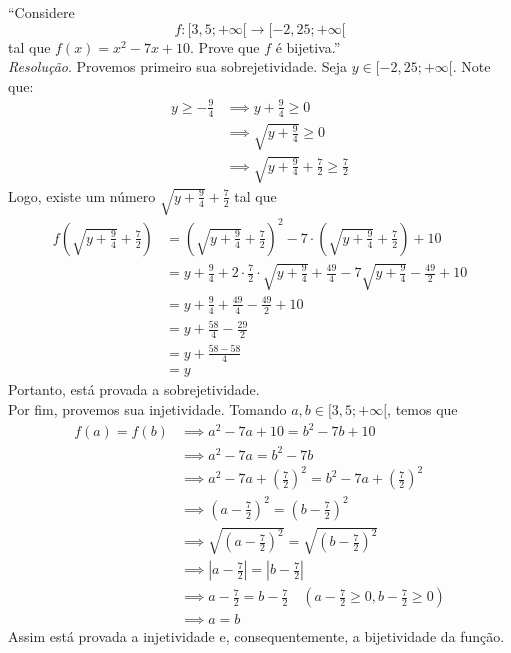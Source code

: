 \enquote{Considere 
\begin{displaymath}
    f: [3,5; +\infty[ \rightarrow  [-2,25; + \infty[
\end{displaymath}
tal que $f(x) = x^2 - 7x + 10$. Prove que $f$ é bijetiva.}
\\ \emph{Resolução}. Provemos primeiro sua sobrejetividade. Seja $y \in [-2,25; + \infty[$. Note que: 
\begin{align*}
    y \ge -\frac{9}{4} & \implies y + \frac{9}{4} \ge 0 \\ & \implies
    \sqrt{y + \frac{9}{4}} \ge 0 \\ & \implies
    \sqrt{y + \frac{9}{4}} + \frac{7}{2} \ge \frac{7}{2}
\end{align*}
Logo, existe um número $\sqrt{y + \frac{9}{4}} + \frac{7}{2}$ tal que
\begin{align*}
    f(\sqrt{y + \frac{9}{4}} + \frac{7}{2}) & = (\sqrt{y + \frac{9}{4}} + \frac{7}{2})^2 - 7 \cdot (\sqrt{y + \frac{9}{4}} + \frac{7}{2}) + 10 \\ & =
    y + \frac{9}{4} + 2\cdot\frac{7}{2}\cdot \sqrt{y + \frac{9}{4}} + \frac{49}{4} -7\sqrt{y + \frac{9}{4}} - \frac{49}{2} + 10 \\ & =
    y + \frac{9}{4} + \frac{49}{4} - \frac{49}{2} + 10 \\ & =
    y + \frac{58}{4} - \frac{29}{2} \\ & =
    y + \frac{58 - 58}{4} \\ & =
    y
\end{align*}
Portanto, está provada a sobrejetividade. \\
Por fim, provemos sua injetividade. Tomando $a, b \in [3,5; +\infty[$, temos que
\begin{align*}
    f(a) = f(b) & \implies a^2 - 7a + 10 = b^2 - 7b + 10 \\ & \implies
    a^2 - 7a = b^2 - 7b \\ & \implies
    a^2 - 7a + (\frac{7}{2})^2 = b^2 - 7a + (\frac{7}{2})^2 \\ & \implies
    (a - \frac{7}{2})^2 = (b - \frac{7}{2})^2 \\ & \implies
    \sqrt{(a - \frac{7}{2})^2} = \sqrt{(b - \frac{7}{2})^2} \\ & \implies
    |a - \frac{7}{2}| = |b - \frac{7}{2}| \\ & \implies
    a - \frac{7}{2} = b - \frac{7}{2} \quad (a - \frac{7}{2} \ge 0, b - \frac{7}{2} \ge 0) \\ & \implies
    a = b
\end{align*}
Assim está provada a injetividade e, consequentemente, a bijetividade da função.
